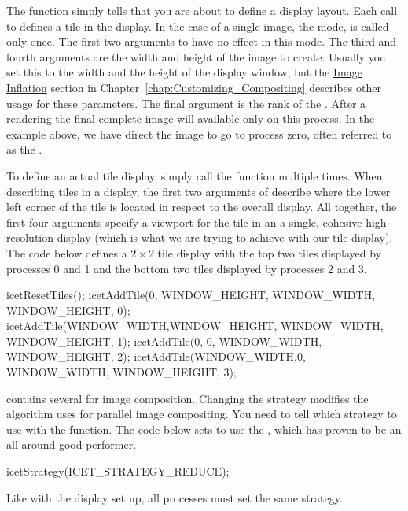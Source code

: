 {The  function simply tells \IceT that you are about
to define a display layout.  Each call to  defines a
tile in the display.  In the case of a single image, the
 mode,
 is called only once.  The first two arguments to
 have no effect in this mode.  The third and fourth
arguments are the width and height of the image to create.  Usually you set
this to the width and the height of the display window, but the
\hyperref[sec:Customizing_Compositing:Image_Inflation]{Image Inflation}
section in Chapter~\ref{chap:Customizing_Compositing} describes other usage
for these parameters.  The final argument is the rank of the
.  After a rendering the
final complete image will available only on this process.  In the example
above, we have direct the image to go to process zero, often referred to as
the .

To define an actual tile display, simply call the 
function multiple times.  When describing tiles in a display, the first two
arguments of  describe where the lower left corner of
the tile is located in respect to the overall display.  All together, the
first four arguments specify a viewport for the tile in an a single,
cohesive high resolution display (which is what we are trying to achieve
with our tile display).  The code below defines a $2 \times 2$ tile display
with the top two tiles displayed by processes 0 and 1 and the bottom two
tiles displayed by processes 2 and 3.
\begin{code}
    icetResetTiles();
    icetAddTile(0,           WINDOW_HEIGHT, WINDOW_WIDTH, WINDOW_HEIGHT, 0);
    icetAddTile(WINDOW_WIDTH,WINDOW_HEIGHT, WINDOW_WIDTH, WINDOW_HEIGHT, 1);
    icetAddTile(0,           0,             WINDOW_WIDTH, WINDOW_HEIGHT, 2);
    icetAddTile(WINDOW_WIDTH,0,             WINDOW_WIDTH, WINDOW_HEIGHT, 3);
\end{code}

\IceT contains several  for image
composition.  Changing the strategy modifies the algorithm \IceT uses for
parallel image compositing.  You need to tell \IceT which strategy to use
with the  function.  The code below sets \IceT to use
the , which has proven to
be an all-around good performer.
\begin{code}
    icetStrategy(ICET_STRATEGY_REDUCE);
\end{code}
Like with the display set up, all processes must set the same strategy.

}
